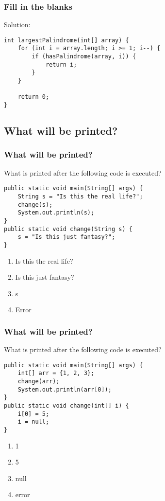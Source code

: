 \documentclass[9pt]{beamer}
\begin{document}
\begin{frame}[fragile]
  \frametitle{Fill in the blanks}
  Solution:
  \begin{lstlisting}
int largestPalindrome(int[] array) {
    for (int i = array.length; i >= 1; i--) {
        if (hasPalindrome(array, i)) {
            return i;
        }
    }

    return 0;
}
  \end{lstlisting}
\end{frame}

\subsection{What will be printed?}
\begin{frame}[fragile]
  \frametitle{What will be printed?}
  What is printed after the following code is executed?
  \begin{lstlisting}
public static void main(String[] args) {
    String s = "Is this the real life?";
    change(s);
    System.out.println(s);
}
public static void change(String s) {
    s = "Is this just fantasy?";
}
  \end{lstlisting}
  \begin{enumerate}
    \item
      \alert<2>{Is this the real life?}
    \item
      Is this just fantasy?
    \item
      s
    \item
      Error
  \end{enumerate}
\end{frame}

\begin{frame}[fragile]
  \frametitle{What will be printed?}
  What is printed after the following code is executed?
  \begin{lstlisting}
public static void main(String[] args) {
    int[] arr = {1, 2, 3};
    change(arr);
    System.out.println(arr[0]);
}
public static void change(int[] i) {
    i[0] = 5;
    i = null;
}
  \end{lstlisting}
  \begin{enumerate}
    \item
      1
    \item
      \alert<2>{5}
    \item
      null
    \item
      error
  \end{enumerate}
\end{frame}
\end{document}
